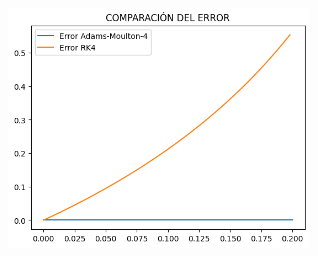 \begin{frame}{}
    \begin{figure}
        \centering
        \includegraphics[width=8cm]{p12-Comp-error.png}
        \label{fig:enter-label}
    \end{figure}
\end{frame}